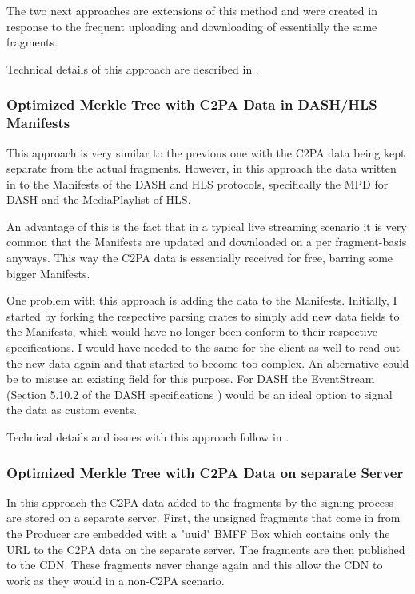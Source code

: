 The two next approaches are extensions of this method and were created in response to the frequent uploading and downloading of essentially the same fragments.

Technical details of this approach are described in .

\subsubsection{Optimized Merkle Tree with C2PA Data in DASH/HLS Manifests}

This approach is very similar to the previous one with the C2PA data being kept separate from the actual fragments. However, in this approach the data written in to the Manifests of the DASH and HLS protocols, specifically the MPD for DASH and the MediaPlaylist of HLS.

An advantage of this is the fact that in a typical live streaming scenario it is very common that the Manifests are updated and downloaded on a per fragment-basis anyways. This way the C2PA data is essentially received for free, barring some bigger Manifests.

One problem with this approach is adding the data to the Manifests. Initially, I started by forking the respective parsing crates to simply add new data fields to the Manifests, which would have no longer been conform to their respective specifications. I would have needed to the same for the client as well to read out the new data again and that started to become too complex. An alternative could be to misuse an existing field for this purpose. For DASH the EventStream (Section 5.10.2 of the DASH specifications \cite{DASH})  would be an ideal option to signal the data as custom events. 

Technical details and issues with this approach follow in .

\subsubsection{Optimized Merkle Tree with C2PA Data on separate Server}

In this approach the C2PA data added to the fragments by the signing process are stored on a separate server. First, the unsigned fragments that come in from the Producer are embedded with a "uuid" BMFF Box which contains only the URL to the C2PA data on the separate server. The fragments are then published to the CDN. These fragments never change again and this allow the CDN to work as they would in a non-C2PA scenario.

